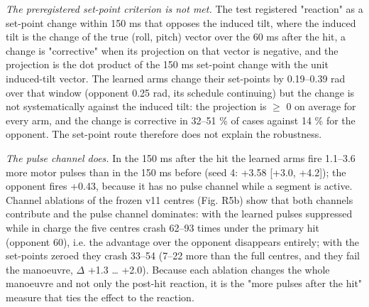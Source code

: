 \documentclass[10pt,a4paper]{article}
\begin{document}
\emph{The preregistered set-point criterion is not met.} The test registered "reaction" as a set-point change within 150 ms that opposes the induced tilt, where the induced tilt is the change of the true (roll, pitch) vector over the 60 ms after the hit, a change is "corrective" when its projection on that vector is negative, and the projection is the dot product of the 150 ms set-point change with the unit induced-tilt vector. The learned arms change their set-points by 0.19--0.39 rad over that window (opponent 0.25 rad, its schedule continuing) but the change is not systematically against the induced tilt: the projection is $\ge$ 0 on average for every arm, and the change is corrective in 32--51 \% of cases against 14 \% for the opponent. The set-point route therefore does not explain the robustness.

\emph{The pulse channel does.} In the 150 ms after the hit the learned arms fire 1.1--3.6 more motor pulses than in the 150 ms before (seed 4: +3.58 [+3.0, +4.2]); the opponent fires +0.43, because it has no pulse channel while a segment is active. Channel ablations of the frozen v11 centres (Fig. R5b) show that both channels contribute and the pulse channel dominates: with the learned pulses suppressed while in charge the five centres crash 62--93 times under the primary hit (opponent 60), i.e. the advantage over the opponent disappears entirely; with the set-points zeroed they crash 33--54 (7--22 more than the full centres, and they fail the manoeuvre, $\Delta$ +1.3 \ldots{} +2.0). Because each ablation changes the whole manoeuvre and not only the post-hit reaction, it is the "more pulses after the hit" measure that ties the effect to the reaction.
\end{document}
